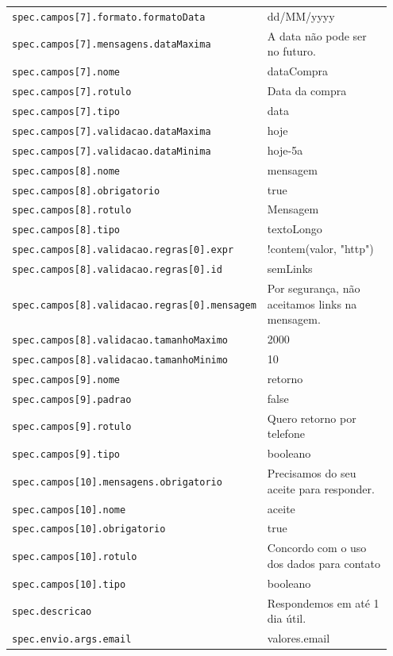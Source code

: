 \begin{tabular}{@{}p{0.35\linewidth}p{0.6\linewidth}@{}}
\texttt{spec.campos[7].formato.formatoData} & dd/MM/yyyy \\
\texttt{spec.campos[7].mensagens.dataMaxima} & A data não pode ser no futuro. \\
\texttt{spec.campos[7].nome} & dataCompra \\
\texttt{spec.campos[7].rotulo} & Data da compra \\
\texttt{spec.campos[7].tipo} & data \\
\texttt{spec.campos[7].validacao.dataMaxima} & hoje \\
\texttt{spec.campos[7].validacao.dataMinima} & hoje-5a \\
\texttt{spec.campos[8].nome} & mensagem \\
\texttt{spec.campos[8].obrigatorio} & true \\
\texttt{spec.campos[8].rotulo} & Mensagem \\
\texttt{spec.campos[8].tipo} & textoLongo \\
\texttt{spec.campos[8].validacao.regras[0].expr} & !contem(valor, "http") \\
\texttt{spec.campos[8].validacao.regras[0].id} & semLinks \\
\texttt{spec.campos[8].validacao.regras[0].mensagem} & Por segurança, não aceitamos links na mensagem. \\
\texttt{spec.campos[8].validacao.tamanhoMaximo} & 2000 \\
\texttt{spec.campos[8].validacao.tamanhoMinimo} & 10 \\
\texttt{spec.campos[9].nome} & retorno \\
\texttt{spec.campos[9].padrao} & false \\
\texttt{spec.campos[9].rotulo} & Quero retorno por telefone \\
\texttt{spec.campos[9].tipo} & booleano \\
\texttt{spec.campos[10].mensagens.obrigatorio} & Precisamos do seu aceite para responder. \\
\texttt{spec.campos[10].nome} & aceite \\
\texttt{spec.campos[10].obrigatorio} & true \\
\texttt{spec.campos[10].rotulo} & Concordo com o uso dos dados para contato \\
\texttt{spec.campos[10].tipo} & booleano \\
\texttt{spec.descricao} & Respondemos em até 1 dia útil. \\
\texttt{spec.envio.args.email} & valores.email \\

\end{tabular}
